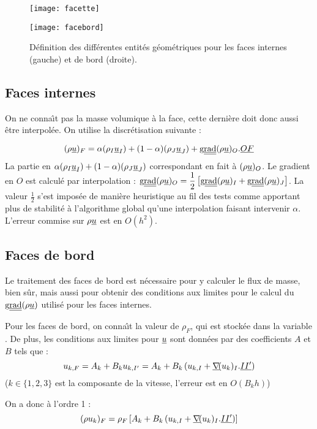 \begin{figure}[h]
\parbox{8cm}{%
\centerline{\texttt{[image: facette]}}}
\parbox{8cm}{%
\centerline{\texttt{[image: facebord]}}}
\caption{\label{Base_Inimas_fig_geom}Définition des différentes entités
géométriques pour les faces internes (gauche) et de bord (droite).}
\end{figure}


\subsection*{Faces internes}
On ne conna\^\i t pas la masse volumique à la face, cette dernière doit donc
aussi être interpolée. On utilise la discrétisation suivante :

\begin{equation}
(\rho \underline{u})_F = \alpha(\rho_I \underline{u}_I)
+(1-\alpha)(\rho_J \underline{u}_J)
+\text{g}\underline{\underline{{\text{rad}}}}\,\!(\rho\underline{u})_O.\underline{OF}
\end{equation}
La partie en $\alpha(\rho_I \underline{u}_I)
+(1-\alpha)(\rho_J \underline{u}_J)$ correspondant en fait à
$(\rho\underline{u})_O$. Le gradient en $O$ est calculé par interpolation :
$\displaystyle\text{g}\underline{\underline{{\text{rad}}}}\,\!(\rho\underline{u})_O=
\frac{1}{2}\left[\text{g}\underline{\underline{{\text{rad}}}}\,\!(\rho\underline{u})_I+\text{g}\underline{\underline{{\text{rad}}}}\,\!(\rho\underline{u})_J\right]$. La
valeur $\displaystyle\frac{1}{2}$ s'est imposée de manière heuristique au
fil des tests
comme apportant plus de stabilité à l'algorithme global qu'une interpolation
faisant intervenir $\alpha$. L'erreur commise sur $\rho\underline{u}$ est en
$O(h^2)$.


\subsection*{Faces de bord}
Le traitement des faces de bord est nécessaire pour y calculer le flux de
masse, bien sûr, mais aussi pour obtenir des conditions aux limites pour le
calcul du $\text{g}\underline{\underline{{\text{rad}}}}\,\!(\rho \underline{u})$ utilisé pour les faces internes.

Pour les faces de bord, on conna\^\i t la valeur de $\rho_F$, qui est stockée
dans la variable . De plus, les conditions aux limites pour $\underline{u}$
sont données par des coefficients $A$ et $B$ tels que :
\begin{equation}
u_{k,F} = A_k + B_ku_{k,I^\prime} =
A_k + B_k\left(u_{k,I} + \underline{\nabla}\!(u_k)_I.\underline{II^\prime}\right)
\end{equation}
($k\in\{1,2,3\}$ est la composante de la vitesse, l'erreur est en $O(B_kh)$)

On a donc à l'ordre 1 :
\begin{equation}
(\rho u_k)_F = \rho_F\left[A_k + B_k\left(u_{k,I} +
\underline{\nabla}\!(u_k)_I.\underline{II^\prime}\right)\right]
\end{equation}

